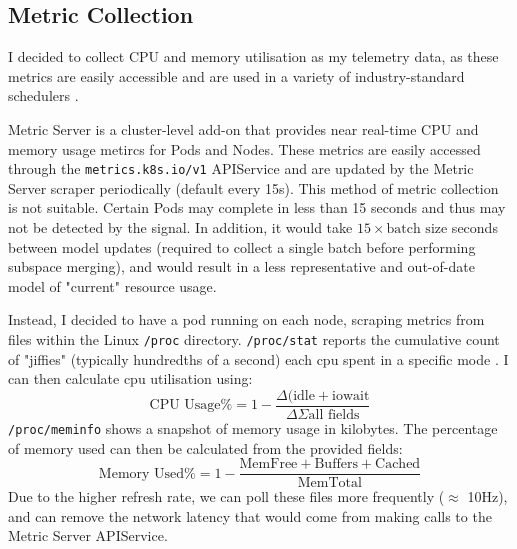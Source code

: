 \subsection{Metric Collection}
I decided to collect CPU and memory utilisation as my telemetry data, as these
metrics are easily accessible and are used in a variety of industry-standard
schedulers \cite{hadoop2016apache,sahasrabudhe_improved_2015}.

Metric Server is a cluster-level add-on that provides near real-time CPU and
memory usage metircs for Pods and Nodes. These metrics are easily accessed through
the \verb|metrics.k8s.io/v1| APIService and are updated by the Metric Server scraper
periodically (default every 15s). This method of metric collection is not
suitable. Certain Pods may complete in less than 15 seconds and thus may not
be detected by the signal. In addition, it would take $15 \times \text{batch size}$
seconds between model updates (required to collect a single
batch before performing subspace merging), and would result in a less
representative and out-of-date model of "current" resource usage.

Instead, I decided to have a pod running on each node, scraping
metrics from files within the Linux \verb|/proc| directory.
\verb|/proc/stat| reports the cumulative count of "jiffies" (typically
hundredths of a second) each cpu spent in a specific mode \cite{proc_stat5}.
I can then calculate cpu utilisation using:
\[ \text{CPU Usage\%} = 1 - \frac{\Delta(\text{idle} +
\text{iowait}}{\Delta{\Sigma \text{all fields}}} \]
\verb|/proc/meminfo| shows a snapshot of memory usage in kilobytes. The
percentage of memory used can then be calculated from the provided fields:
\[ \text{Memory Used\%} = 1 - \frac{\text{MemFree} +
\text{Buffers} + \text{Cached}}{\text{MemTotal}}\]
Due to the higher refresh rate, we can poll these files more frequently
($\approx$ 10Hz), and can remove the network latency that would come from
making calls to the Metric Server APIService.


